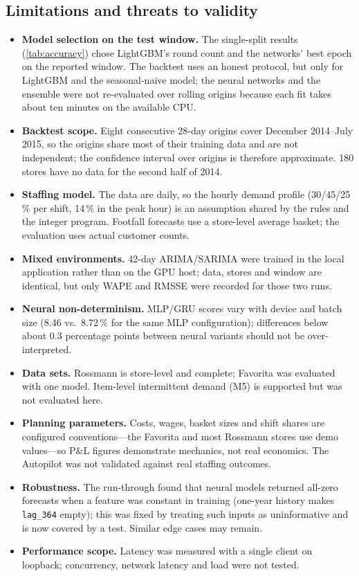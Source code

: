 \documentclass[conference]{IEEEtran}
\newcommand{\code}[1]{\texttt{\small #1}}
\begin{document}
\subsection{Limitations and threats to validity}
\begin{itemize}
\item \textbf{Model selection on the test window.} The single-split results (\cref{tab:accuracy})
  chose LightGBM's round count and the networks' best epoch on the reported window. The backtest uses
  an honest protocol, but only for LightGBM and the seasonal-naive model; the neural networks and the
  ensemble were not re-evaluated over rolling origins because each fit takes about ten minutes on the
  available CPU.
\item \textbf{Backtest scope.} Eight consecutive 28-day origins cover December 2014--July 2015, so
  the origins share most of their training data and are not independent; the confidence interval over
  origins is therefore approximate. 180 stores have no data for the second half of 2014.
\item \textbf{Staffing model.} The data are daily, so the hourly demand profile (30/45/25\,\% per
  shift, 14\,\% in the peak hour) is an assumption shared by the rules and the integer program.
  Footfall forecasts use a store-level average basket; the evaluation uses actual customer counts.
\item \textbf{Mixed environments.} 42-day ARIMA/SARIMA were trained in the local application rather
  than on the GPU host; data, stores and window are identical, but only WAPE and RMSSE were recorded
  for those two runs.
\item \textbf{Neural non-determinism.} MLP/GRU scores vary with device and batch size (8.46 vs.\
  8.72\,\% for the same MLP configuration); differences below about 0.3 percentage points between
  neural variants should not be over-interpreted.
\item \textbf{Data sets.} Rossmann is store-level and complete; Favorita was evaluated with one model.
  Item-level intermittent demand (M5) is supported but was not evaluated here.
\item \textbf{Planning parameters.} Costs, wages, basket sizes and shift shares are configured
  conventions---the Favorita and most Rossmann stores use demo values---so P\&L figures demonstrate
  mechanics, not real economics. The Autopilot was not validated against real staffing outcomes.
\item \textbf{Robustness.} The run-through found that neural models returned all-zero forecasts when
  a feature was constant in training (one-year history makes \code{lag\_364} empty); this was fixed
  by treating such inputs as uninformative and is now covered by a test. Similar edge cases may remain.
\item \textbf{Performance scope.} Latency was measured with a single client on loopback; concurrency,
  network latency and load were not tested.
\end{itemize}
\end{document}
